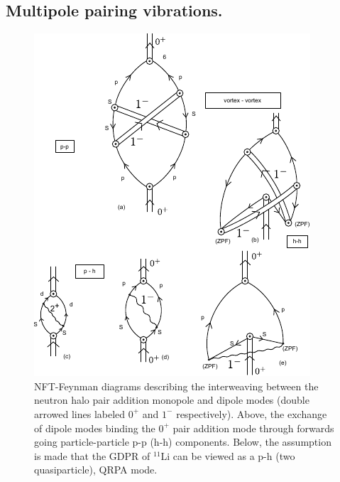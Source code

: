 \begin{subappendices}
\section{Multipole pairing vibrations.}\label{App6G}
\begin{figure}
\includegraphics[width=\textwidth]{C8/figsC8/figA1_corr.pdf}
\caption{ NFT-Feynman diagrams describing the interweaving between the neutron halo pair addition monopole and dipole modes
(double arrowed lines labeled $0^+$ and $1^-$ respectively). Above, the exchange of dipole modes binding the $0^+$ pair addition mode through  forwards going particle-particle p-p (h-h) components. Below,  the assumption is made that the GDPR of $^{11}$Li can be viewed as a p-h (two quasiparticle), QRPA mode.}\label{fig6.I.1}
\end{figure}


\end{subappendices}
